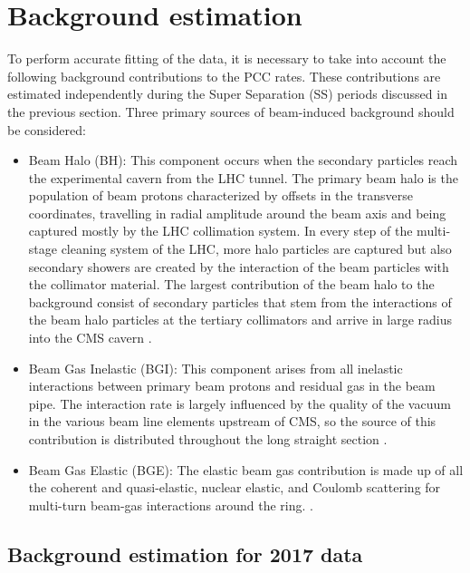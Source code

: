 \clearpage
\newpage
\section{Background estimation}
\label{bkg}


To perform accurate fitting of the data, it is necessary to take into account the following background contributions to the PCC rates. These contributions are estimated independently during the Super Separation (SS) periods discussed in the previous section. Three primary sources of beam-induced background should be considered:

\begin{itemize}

\item Beam Halo (BH): This component occurs when the secondary particles reach the experimental cavern from the LHC tunnel. The primary beam halo is  the population of beam protons characterized by offsets in the transverse coordinates, travelling in  radial amplitude around the beam axis and being captured mostly by the LHC collimation system. In every step of the multi-stage cleaning system of the LHC, more halo particles are captured but also secondary showers are created by the interaction of the beam particles with the collimator material. The largest contribution of the  beam halo to the background consist of secondary particles  that stem from the interactions of the beam halo particles at the tertiary collimators and arrive in large radius into the CMS cavern \cite{beam_halo}.

\item  Beam Gas Inelastic (BGI): This component arises from all inelastic interactions between primary beam protons and residual gas in the beam pipe. The interaction rate is largely influenced by the quality of the vacuum in the various beam line elements upstream of CMS, so the source of this contribution is distributed throughout the long straight section \cite{bkg_source}.

\item Beam Gas Elastic (BGE): The elastic beam gas contribution is made up of all the coherent and quasi-elastic, nuclear elastic, and Coulomb scattering for multi-turn beam-gas interactions around the ring.  \cite{bkg_source}.

\end{itemize}


\subsection{Background estimation for 2017 data}
\label{bkg}


